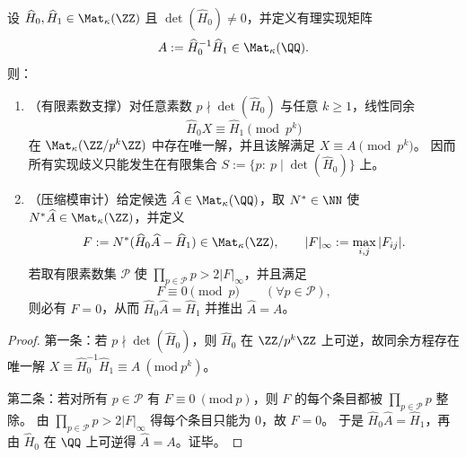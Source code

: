 \begin{proposition}\label{prop:xi-hankel-linear-realization-finite-prime-support-mod-audit}
设 \(\widehat H_0,\widehat H_1\in\Mat_{\kappa}(\ZZ)\) 且 \(\det(\widehat H_0)\neq 0\)，并定义有理实现矩阵
\[
A:=\widehat H_0^{-1}\widehat H_1\in\Mat_{\kappa}(\QQ).
\]
则：
\begin{enumerate}
  \item \textnormal{（有限素数支撑）}对任意素数 \(p\nmid\det(\widehat H_0)\) 与任意 \(k\ge 1\)，线性同余
  \[
  \widehat H_0X\equiv \widehat H_1\pmod{p^k}
  \]
  在 \(\Mat_{\kappa}(\ZZ/p^k\ZZ)\) 中存在唯一解，并且该解满足 \(X\equiv A\pmod{p^k}\)。
  因而所有实现歧义只能发生在有限集合 \(S:=\{p:\ p\mid \det(\widehat H_0)\}\) 上。
  \item \textnormal{（压缩模审计）}给定候选 \(\widehat A\in\Mat_{\kappa}(\QQ)\)，取 \(N^\ast\in\NN\) 使 \(N^\ast\widehat A\in\Mat_{\kappa}(\ZZ)\)，并定义
  \[
  F:=N^\ast(\widehat H_0\widehat A-\widehat H_1)\in\Mat_{\kappa}(\ZZ),
  \qquad
  |F|_\infty:=\max_{i,j}|F_{ij}|.
  \]
  若取有限素数集 \(\mathcal P\) 使 \(\prod_{p\in\mathcal P}p>2|F|_\infty\)，并且满足
  \[
  F\equiv 0\pmod p\qquad(\forall p\in\mathcal P),
  \]
  则必有 \(F=0\)，从而 \(\widehat H_0\widehat A=\widehat H_1\) 并推出 \(\widehat A=A\)。
\end{enumerate}
\end{proposition}

\begin{proof}
第一条：若 \(p\nmid\det(\widehat H_0)\)，则 \(\widehat H_0\) 在 \(\ZZ/p^k\ZZ\) 上可逆，故同余方程存在唯一解
\(
X\equiv \widehat H_0^{-1}\widehat H_1\equiv A\ (\mathrm{mod}\ p^k)
\)。
\par
第二条：若对所有 \(p\in\mathcal P\) 有 \(F\equiv 0\ (\mathrm{mod}\ p)\)，则 \(F\) 的每个条目都被 \(\prod_{p\in\mathcal P}p\) 整除。
由 \(\prod_{p\in\mathcal P}p>2|F|_\infty\) 得每个条目只能为 \(0\)，故 \(F=0\)。
于是 \(\widehat H_0\widehat A=\widehat H_1\)，再由 \(\widehat H_0\) 在 \(\QQ\) 上可逆得 \(\widehat A=A\)。证毕。
\end{proof}

